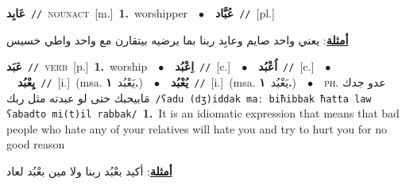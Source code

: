 \documentclass[10pt,a4paper,twoside]{article} %
\begin{document}
\begin{multicols}{2}
{\setlength\topsep{0pt}\textbf{\foreignlanguage{arabic}{عَابِد}}\ {\color{gray}\texttt{//}\color{black}}\ \textsc{noun\textunderscore act}\ [m.]\ \textbf{1.}~worshipper\ \ $\bullet$\ \ \setlength\topsep{0pt}\textbf{\foreignlanguage{arabic}{عُبَّاد}}\ {\color{gray}\texttt{//}\color{black}}\ [pl.]\  \begin{flushright}\color{gray}\foreignlanguage{arabic}{\textbf{\underline{\foreignlanguage{arabic}{أمثلة}}}: يعني واحد صايم وعابِد ربنا بما يرضيه بيتقارن مع واحد واطي خسيس}\end{flushright}\color{black}} \vspace{2mm}

{\setlength\topsep{0pt}\textbf{\foreignlanguage{arabic}{عَبَد}}\ {\color{gray}\texttt{//}\color{black}}\ \textsc{verb}\ [p.]\ \textbf{1.}~worship\ \ $\bullet$\ \ \setlength\topsep{0pt}\textbf{\foreignlanguage{arabic}{اِعْبُد}}\ {\color{gray}\texttt{//}\color{black}}\ [c.]\ \ $\bullet$\ \ \setlength\topsep{0pt}\textbf{\foreignlanguage{arabic}{اُعْبُد}}\ {\color{gray}\texttt{//}\color{black}}\ [c.]\ \ $\bullet$\ \ \setlength\topsep{0pt}\textbf{\foreignlanguage{arabic}{يِعْبُد}}\ {\color{gray}\texttt{//}\color{black}}\ [i.]\ \color{gray}(msa. \foreignlanguage{arabic}{يَعْبُد}~\foreignlanguage{arabic}{\textbf{١.}})\color{black}\ \ $\bullet$\ \ \setlength\topsep{0pt}\textbf{\foreignlanguage{arabic}{يُعْبُد}}\ {\color{gray}\texttt{//}\color{black}}\ [i.]\ \color{gray}(msa. \foreignlanguage{arabic}{يَعْبُد}~\foreignlanguage{arabic}{\textbf{١.}})\color{black}\ \ $\bullet$\ \ \textsc{ph.} \color{gray} \foreignlanguage{arabic}{عدو جدك مَابيحبك حتى لو عبدته مثل ربك}\color{black}\ {\color{gray}\texttt{/{\sffamily ʕadu (dʒ)iddak maː biħibbak ħatta law ʕabadto mi(t)il rabbak}/}\color{black}}\ \textbf{1.}~It is an idiomatic expression that means that bad people who hate any of your relatives will hate you and try to hurt you for no good reason\  \begin{flushright}\color{gray}\foreignlanguage{arabic}{\textbf{\underline{\foreignlanguage{arabic}{أمثلة}}}: أكيد بعْبُد ربنا ولا مين بعْبُد لعاد}\end{flushright}\color{black}} \vspace{2mm}


\end{multicols}
\end{document}

